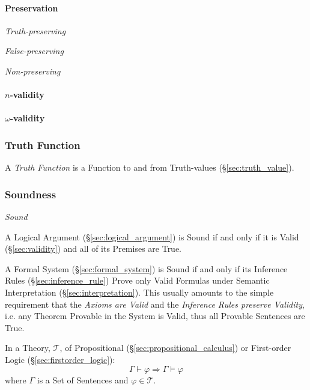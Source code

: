 \paragraph{Preservation}\label{sec:preservation}\hfill

\emph{Truth-preserving}

\emph{False-preserving}

\emph{Non-preserving}



\paragraph{$n$-validity}\label{sec:n_validity}\hfill

\paragraph{$\omega$-validity}\label{sec:omega_validity}\hfill



\subsubsection{Truth Function}\label{sec:truth_function}

A \emph{Truth Function} is a Function to and from Truth-values
(\S\ref{sec:truth_value}).



\subsubsection{Soundness}\label{sec:soundness}

\emph{Sound}

A Logical Argument (\S\ref{sec:logical_argument}) is Sound if and only
if it is Valid (\S\ref{sec:validity}) and all of its Premises are
True.

A Formal System (\S\ref{sec:formal_system}) is Sound if and only if its
Inference Rules (\S\ref{sec:inference_rule}) Prove only Valid Formulas under
Semantic Interpretation (\S\ref{sec:interpretation}). This usually amounts to
the simple requirement that the \emph{Axioms are Valid} and the \emph{Inference
  Rules preserve Validity}, i.e. any Theorem Provable in the System is Valid,
thus all Provable Sentences are True.

In a Theory, $\mathcal{T}$, of Propositional
(\S\ref{sec:propositional_calculus}) or First-order Logic
(\S\ref{sec:firstorder_logic}):
\[
  \Gamma \vdash \varphi \Rightarrow \Gamma \vDash \varphi
\]
where $\Gamma$ is a Set of Sentences and $\varphi \in \mathcal{T}$.

